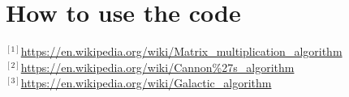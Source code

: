 \documentclass[12pt]{article}
\begin{document}
	\section{How to use the code}
	
	
	\newpage
	
	
	
	$^{[1]}$\url{https://en.wikipedia.org/wiki/Matrix_multiplication_algorithm}\\
	$^{[2]}$\url{https://en.wikipedia.org/wiki/Cannon%27s_algorithm}\\
	$^{[3]}$\url{https://en.wikipedia.org/wiki/Galactic_algorithm}\\
	
	
\end{document}
